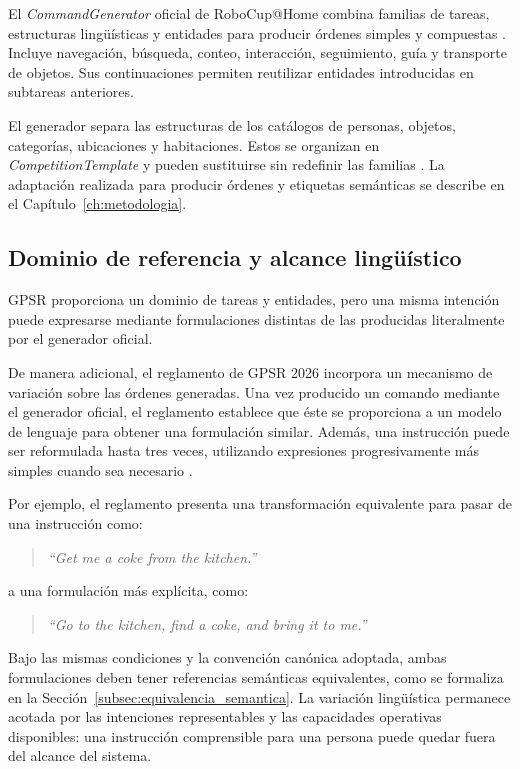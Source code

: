 El \textit{CommandGenerator} oficial de RoboCup@Home combina familias de tareas, estructuras lingüísticas y entidades para producir órdenes simples y compuestas \cite{robocup_command_generator}. Incluye navegación, búsqueda, conteo, interacción, seguimiento, guía y transporte de objetos. Sus continuaciones permiten reutilizar entidades introducidas en subtareas anteriores.

El generador separa las estructuras de los catálogos de personas, objetos, categorías, ubicaciones y habitaciones. Estos se organizan en \textit{CompetitionTemplate} y pueden sustituirse sin redefinir las familias \cite{robocup_competition_template}. La adaptación realizada para producir órdenes y etiquetas semánticas se describe en el Capítulo~\ref{ch:metodologia}.

\subsection{Dominio de referencia y alcance lingüístico}
\label{subsec:dominio_referencia}

GPSR proporciona un dominio de tareas y entidades, pero una misma intención puede expresarse mediante formulaciones distintas de las producidas literalmente por el generador oficial.

De manera adicional, el reglamento de GPSR 2026 incorpora un mecanismo de variación 
sobre las órdenes generadas. Una vez producido un comando mediante el generador oficial, el
reglamento establece que éste se proporciona a un modelo de lenguaje para
obtener una formulación similar. Además, una instrucción puede ser reformulada
hasta tres veces, utilizando expresiones progresivamente más simples cuando sea
necesario \cite{robocuphome2026rulebook}.

Por ejemplo, el reglamento presenta una transformación equivalente para pasar de
una instrucción como:

\begin{quote}
\textit{``Get me a coke from the kitchen.''}
\end{quote}

a una formulación más explícita, como:

\begin{quote}
\textit{``Go to the kitchen, find a coke, and bring it to me.''}
\end{quote}

Bajo las mismas condiciones y la convención canónica adoptada, ambas formulaciones deben tener referencias semánticas equivalentes, como se formaliza en la Sección~\ref{subsec:equivalencia_semantica}. La variación lingüística permanece acotada por las intenciones representables y las capacidades operativas disponibles: una instrucción comprensible para una persona puede quedar fuera del alcance del sistema.

